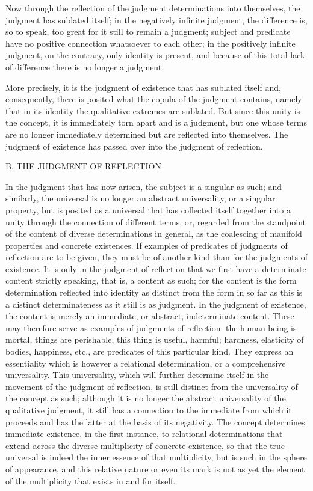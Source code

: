 Now through the reflection of
the judgment determinations into themselves,
the judgment has sublated itself;
in the negatively infinite judgment,
the difference is, so to speak, too great
for it still to remain a judgment;
subject and predicate have no
positive connection whatsoever to each other;
in the positively infinite judgment,
on the contrary, only identity is present,
and because of this total lack of difference
there is no longer a judgment.

More precisely, it is the judgment of existence
that has sublated itself
and, consequently, there is posited
what the copula of the judgment contains,
namely that in its identity
the qualitative extremes are sublated.
But since this unity is the concept,
it is immediately torn apart
and is a judgment,
but one whose terms are
no longer immediately determined
but are reflected into themselves.
The judgment of existence has passed over
into the judgment of reflection.

B. THE JUDGMENT OF REFLECTION

In the judgment that has now arisen,
the subject is a singular as such;
and similarly, the universal is
no longer an abstract universality,
or a singular property,
but is posited as a universal
that has collected itself together
into a unity through the connection of different terms,
or, regarded from the standpoint of the content
of diverse determinations in general,
as the coalescing of
manifold properties and concrete existences.
If examples of predicates
of judgments of reflection are to be given,
they must be of another kind
than for the judgments of existence.
It is only in the judgment of reflection
that we first have a determinate content strictly speaking,
that is, a content as such;
for the content is the form determination
reflected into identity as distinct from the form
in so far as  this is a distinct determinateness
as it still is as judgment.
In the judgment of existence,
the content is merely an immediate,
or abstract, indeterminate content.
These may therefore serve as examples
of judgments of reflection:
the human being is mortal,
things are perishable,
this thing is useful, harmful;
hardness, elasticity of bodies, happiness, etc.,
are predicates of this particular kind.
They express an essentiality
which is however a relational determination,
or a comprehensive universality.
This universality, which will further determine
itself in the movement of the judgment of reflection,
is still distinct from the universality
of the concept as such;
although it is no longer
the abstract universality of the qualitative judgment,
it still has a connection to the immediate
from which it proceeds
and has the latter at the basis of its negativity.
The concept determines immediate existence,
in the first instance,
to relational determinations that extend
across the diverse multiplicity of concrete existence,
so that the true universal is indeed
the inner essence of that multiplicity,
but is such in the sphere of appearance,
and this relative nature or even its mark
is not as yet the element of the multiplicity
that exists in and for itself.

